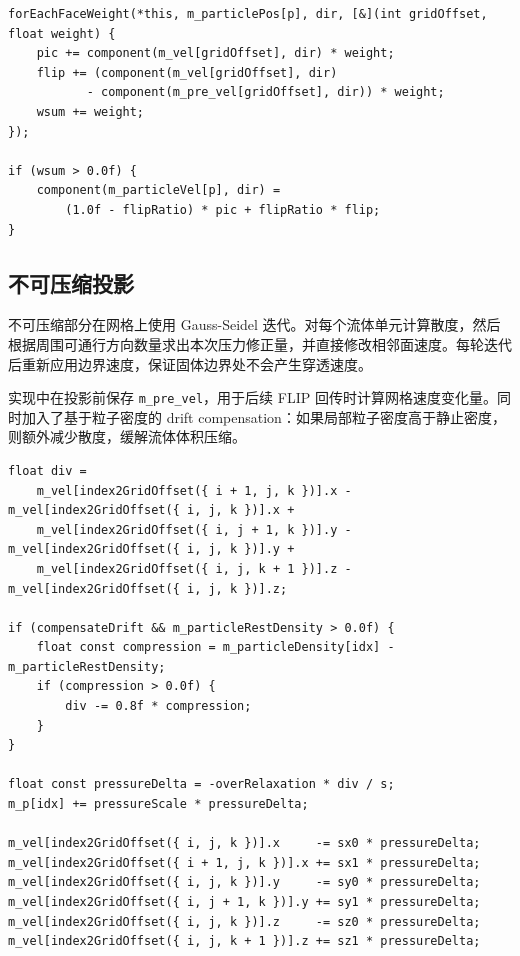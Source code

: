 \documentclass[UTF8,a4paper,11pt]{ctexart}
\begin{document}
\begin{lstlisting}[style=cppstyle,caption={PIC/FLIP 混合回传}]
forEachFaceWeight(*this, m_particlePos[p], dir, [&](int gridOffset, float weight) {
    pic += component(m_vel[gridOffset], dir) * weight;
    flip += (component(m_vel[gridOffset], dir)
           - component(m_pre_vel[gridOffset], dir)) * weight;
    wsum += weight;
});

if (wsum > 0.0f) {
    component(m_particleVel[p], dir) =
        (1.0f - flipRatio) * pic + flipRatio * flip;
}
\end{lstlisting}

\subsection{不可压缩投影}

不可压缩部分在网格上使用 Gauss-Seidel 迭代。对每个流体单元计算散度，然后根据周围可通行方向数量求出本次压力修正量，并直接修改相邻面速度。每轮迭代后重新应用边界速度，保证固体边界处不会产生穿透速度。

实现中在投影前保存 \texttt{m\_pre\_vel}，用于后续 FLIP 回传时计算网格速度变化量。同时加入了基于粒子密度的 drift compensation：如果局部粒子密度高于静止密度，则额外减少散度，缓解流体体积压缩。

\begin{lstlisting}[style=cppstyle,caption={Gauss-Seidel 压力投影}]
float div =
    m_vel[index2GridOffset({ i + 1, j, k })].x - m_vel[index2GridOffset({ i, j, k })].x +
    m_vel[index2GridOffset({ i, j + 1, k })].y - m_vel[index2GridOffset({ i, j, k })].y +
    m_vel[index2GridOffset({ i, j, k + 1 })].z - m_vel[index2GridOffset({ i, j, k })].z;

if (compensateDrift && m_particleRestDensity > 0.0f) {
    float const compression = m_particleDensity[idx] - m_particleRestDensity;
    if (compression > 0.0f) {
        div -= 0.8f * compression;
    }
}

float const pressureDelta = -overRelaxation * div / s;
m_p[idx] += pressureScale * pressureDelta;

m_vel[index2GridOffset({ i, j, k })].x     -= sx0 * pressureDelta;
m_vel[index2GridOffset({ i + 1, j, k })].x += sx1 * pressureDelta;
m_vel[index2GridOffset({ i, j, k })].y     -= sy0 * pressureDelta;
m_vel[index2GridOffset({ i, j + 1, k })].y += sy1 * pressureDelta;
m_vel[index2GridOffset({ i, j, k })].z     -= sz0 * pressureDelta;
m_vel[index2GridOffset({ i, j, k + 1 })].z += sz1 * pressureDelta;
\end{lstlisting}
\end{document}
